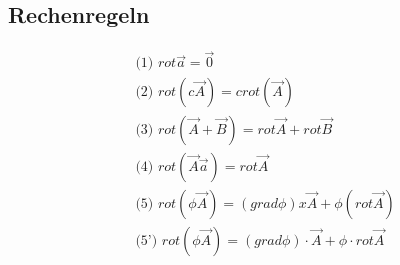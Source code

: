 \documentclass[a4paper,10pt]{scrartcl}
\begin{document}
        \subsection*{Rechenregeln}
        \begin{equation*}
            \begin{aligned}
                & \text{(1) } rot \vec{a} = \vec{0} \\
                & \text{(2) } rot (c \vec{A}) = c rot(\vec{A}) \\
                & \text{(3) } rot (\vec{A} + \vec{B}) = rot \vec{A} + rot \vec{B} \\
                & \text{(4) } rot (\vec{A} \vec{a}) = rot \vec{A} \\
                & \text{(5) } rot (\phi \vec{A})= (grad \phi) x \vec{A} + \phi(rot \vec{A}) \\
                & \text{(5') } rot (\phi \vec{A})= (grad \phi) \cdot \vec{A} + \phi \cdot rot \vec{A} \\
            \end{aligned}
        \end{equation*}

       
\end{document}
